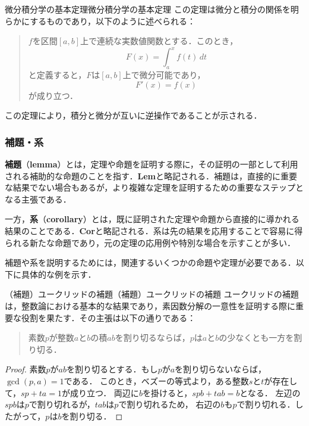 \documentclass[a4paper,11pt]{ltjsarticle}
\renewcommand{\emph}[1]{\textbf{#1}}
\newenvironment{tleftbar}{\begin{tbleftline}\setlength{\parindent}{1\zw}}{\end{tbleftline}}
\begin{document}
\begin{example}{微分積分学の基本定理}{微分積分学の基本定理}
  この定理は微分と積分の関係を明らかにするものであり，以下のように述べられる：
  \begin{quotation}
    $f$を区間$[a, b]$上で連続な実数値関数とする．このとき，
    \[
      F(x) = \int_a^x f(t) \, dt
    \]
    と定義すると，$F$は$[a, b]$上で微分可能であり，
    \[
      F'(x) = f(x)
    \]
    が成り立つ．
  \end{quotation}
  この定理により，積分と微分が互いに逆操作であることが示される．
\end{example}
\subsubsection{補題・系}

\emph{補題}（\emph{lemma}）とは，定理や命題を証明する際に，その証明の一部として利用される補助的な命題のことを指す．\textbf{Lem}と略記される．補題は，直接的に重要な結果でない場合もあるが，より複雑な定理を証明するための重要なステップとなる主張である．

一方，\emph{系}（\emph{corollary}）とは，既に証明された定理や命題から直接的に導かれる結果のことである．\textbf{Cor}と略記される．系は先の結果を応用することで容易に得られる新たな命題であり，元の定理の応用例や特別な場合を示すことが多い．

補題や系を説明するためには，関連するいくつかの命題や定理が必要である．以下に具体的な例を示す．

\begin{example}{（補題）ユークリッドの補題}{（補題）ユークリッドの補題}
  ユークリッドの補題は，整数論における基本的な結果であり，素因数分解の一意性を証明する際に重要な役割を果たす．その主張は以下の通りである：

  \begin{quote}
    素数$p$が整数$a$と$b$の積$ab$を割り切るならば，$p$は$a$と$b$の少なくとも一方を割り切る．
  \end{quote}

\end{example}

\begin{tleftbar}
  \begin{proof}
    素数$p$が$ab$を割り切るとする．もし$p$が$a$を割り切らないならば，$\gcd(p, a) = 1$である．
    このとき，ベズーの等式より，ある整数$s$と$t$が存在して，$sp + ta = 1$が成り立つ．
    両辺に$b$を掛けると，$spb + tab = b$となる．
    左辺の$spb$は$p$で割り切れるが，$tab$は$p$で割り切れるため，
    右辺の$b$も$p$で割り切れる．したがって，$p$は$b$を割り切る．
  \end{proof}
\end{tleftbar}
\end{document}
